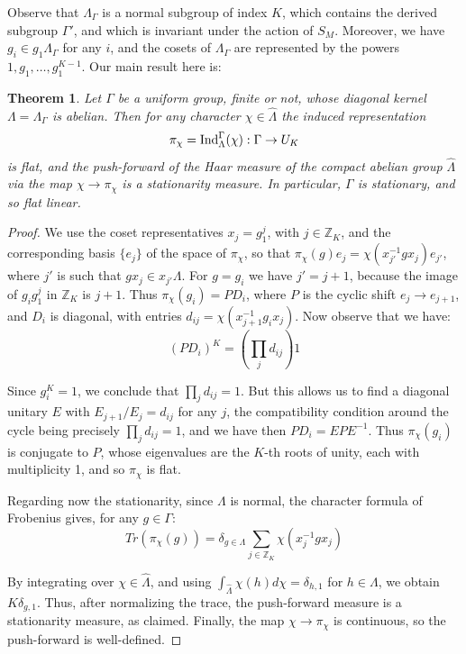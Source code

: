 \documentclass[12pt]{amsart}
\newtheorem{theorem}{Theorem}[section]
\theoremstyle{definition}
\begin{document}
Observe that $\Lambda_\Gamma$ is a normal subgroup of index $K$, which contains the derived subgroup $\Gamma'$, and which is invariant under the action of $S_M$. Moreover, we have $g_i\in g_1\Lambda_\Gamma$ for any $i$, and the cosets of $\Lambda_\Gamma$ are represented by the powers $1,g_1,\ldots,g_1^{K-1}$. Our main result here is:

\begin{theorem}
Let $\Gamma$ be a uniform group, finite or not, whose diagonal kernel $\Lambda=\Lambda_\Gamma$ is abelian. Then for any character $\chi\in\widehat{\Lambda}$ the induced representation
$$\pi_\chi={\rm Ind}_\Lambda^\Gamma(\chi):\Gamma\to U_K$$
is flat, and the push-forward of the Haar measure of the compact abelian group $\widehat{\Lambda}$ via the map $\chi\to\pi_\chi$ is a stationarity measure. In particular, $\Gamma$ is stationary, and so flat linear.
\end{theorem}

\begin{proof}
We use the coset representatives $x_j=g_1^j$, with $j\in\mathbb Z_K$, and the corresponding basis $\{e_j\}$ of the space of $\pi_\chi$, so that $\pi_\chi(g)e_j=\chi(x_{j'}^{-1}gx_j)e_{j'}$, where $j'$ is such that $gx_j\in x_{j'}\Lambda$. For $g=g_i$ we have $j'=j+1$, because the image of $g_ig_1^j$ in $\mathbb Z_K$ is $j+1$. Thus $\pi_\chi(g_i)=PD_i$, where $P$ is the cyclic shift $e_j\to e_{j+1}$, and $D_i$ is diagonal, with entries $d_{ij}=\chi(x_{j+1}^{-1}g_ix_j)$. Now observe that we have:
$$(PD_i)^K=\left(\prod_jd_{ij}\right)1$$

Since $g_i^K=1$, we conclude that $\prod_jd_{ij}=1$. But this allows us to find a diagonal unitary $E$ with $E_{j+1}/E_j=d_{ij}$ for any $j$, the compatibility condition around the cycle being precisely $\prod_jd_{ij}=1$, and we have then $PD_i=EPE^{-1}$. Thus $\pi_\chi(g_i)$ is conjugate to $P$, whose eigenvalues are the $K$-th roots of unity, each with multiplicity 1, and so $\pi_\chi$ is flat.

Regarding now the stationarity, since $\Lambda$ is normal, the character formula of Frobenius gives, for any $g\in\Gamma$:
$$Tr(\pi_\chi(g))=\delta_{g\in\Lambda}\sum_{j\in\mathbb Z_K}\chi(x_j^{-1}gx_j)$$

By integrating over $\chi\in\widehat{\Lambda}$, and using $\int_{\widehat{\Lambda}}\chi(h)d\chi=\delta_{h,1}$ for $h\in\Lambda$, we obtain $K\delta_{g,1}$. Thus, after normalizing the trace, the push-forward measure is a stationarity measure, as claimed. Finally, the map $\chi\to\pi_\chi$ is continuous, so the push-forward is well-defined.
\end{proof}
\end{document}
